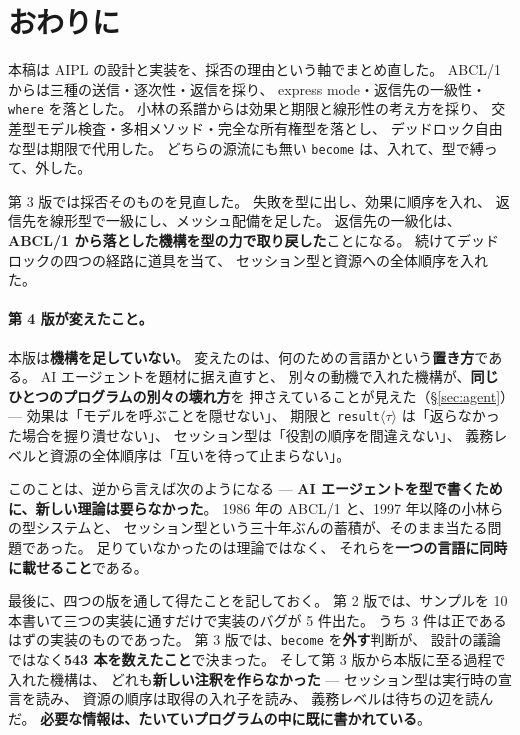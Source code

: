 \documentclass[11pt,a4paper]{ltjsarticle}
\theoremstyle{definition}
\theoremstyle{remark}
\begin{document}
\section{おわりに}

本稿は AIPL の設計と実装を、採否の理由という軸でまとめ直した。
ABCL/1 からは三種の送信・逐次性・返信を採り、
express mode・返信先の一級性・\texttt{where} を落とした。
小林の系譜からは効果と期限と線形性の考え方を採り、
交差型モデル検査・多相メソッド・完全な所有権型を落とし、
デッドロック自由な型は期限で代用した。
どちらの源流にも無い \texttt{become} は、入れて、型で縛って、外した。

第 3 版では採否そのものを見直した。
失敗を型に出し、効果に順序を入れ、
返信先を線形型で一級にし、メッシュ配備を足した。
返信先の一級化は、\textbf{ABCL/1 から落とした機構を型の力で取り戻した}ことになる。
続けてデッドロックの四つの経路に道具を当て、
セッション型と資源への全体順序を入れた。

\paragraph{第 4 版が変えたこと。}
本版は\textbf{機構を足していない}。
変えたのは、何のための言語かという\textbf{置き方}である。
AI エージェントを題材に据え直すと、
別々の動機で入れた機構が、\textbf{同じひとつのプログラムの別々の壊れ方}を
押さえていることが見えた（\S\ref{sec:agent}）---
効果は「モデルを呼ぶことを隠せない」、
期限と \texttt{result}$\langle\tau\rangle$ は「返らなかった場合を握り潰せない」、
セッション型は「役割の順序を間違えない」、
義務レベルと資源の全体順序は「互いを待って止まらない」。

このことは、逆から言えば次のようになる ---
\textbf{AI エージェントを型で書くために、新しい理論は要らなかった}。
1986 年の ABCL/1 と、1997 年以降の小林らの型システムと、
セッション型という三十年ぶんの蓄積が、そのまま当たる問題であった。
足りていなかったのは理論ではなく、
それらを\textbf{一つの言語に同時に載せること}である。

最後に、四つの版を通して得たことを記しておく。
第 2 版では、サンプルを 10 本書いて三つの実装に通すだけで実装のバグが 5 件出た。
うち 3 件は正であるはずの実装のものであった。
第 3 版では、\texttt{become} を\textbf{外す}判断が、
設計の議論ではなく\textbf{543 本を数えたこと}で決まった。
そして第 3 版から本版に至る過程で入れた機構は、
どれも\textbf{新しい注釈を作らなかった} ---
セッション型は実行時の宣言を読み、
資源の順序は取得の入れ子を読み、
義務レベルは待ちの辺を読んだ。
\textbf{必要な情報は、たいていプログラムの中に既に書かれている}。
\end{document}
